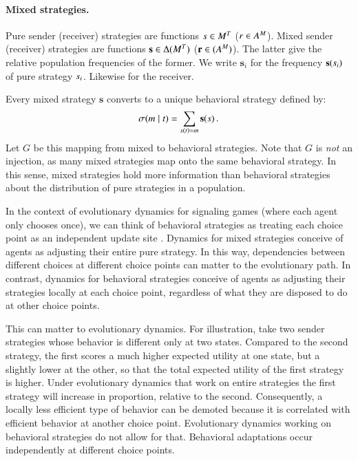 \documentclass[fleqn,reqno,10pt]{article}
\renewcommand{\Smixed}{\ensuremath{\mathrm{\mathbf{s}}}}
\renewcommand{\Rmixed}{\ensuremath{\mathrm{\mathbf{r}}}}
\begin{document}
\paragraph{Mixed strategies.} Pure sender (receiver) strategies are
functions $s \in M^T$ ($r \in
A^M$). Mixed sender (receiver) strategies are functions
$\Smixed \in \Delta(\Messgs^\States)$ ($\Rmixed \in
(\Acts^\Messgs)$). The latter give the relative population frequencies
of the former. We write $\Smixed_i$ for the frequency
$\Smixed(\Spure_i)$ of pure strategy $s_i$. Likewise for the
receiver.

Every mixed strategy $\Smixed$ converts to a unique behavioral
strategy defined by:
\begin{align}
  \label{eq:CorrespondenceBehavioralMixed}
  \Sstrat(\messg \probbar \state) = \sum_{\Spure(\state) = \messg} \Smixed(\Spure)\,.
\end{align} 
Let $G$ be this mapping from mixed to behavioral strategies. Note that $G$
is \emph{not} an injection, as many mixed strategies map onto the same
behavioral strategy. In this sense, mixed strategies hold more
information than behavioral strategies about the distribution of pure strategies in a population.

In the context of evolutionary dynamics for signaling games (where
each agent only chooses once), we can think of behavioral strategies
as treating each choice point as an independent update site
\citep[e.g.][]{Cressman2003:Evolutionary-Dy}. Dynamics for mixed
strategies conceive of agents as adjusting their entire pure
strategy. In this way, dependencies between different choices at
different choice points can matter to the evolutionary path. In
contrast, dynamics for behavioral strategies conceive of agents as
adjusting their strategies locally at each choice point, regardless of
what they are disposed to do at other choice points.

This can matter to evolutionary dynamics. For illustration, take two
sender strategies whose behavior is different only at two
states. Compared to the second strategy, the first scores a much
higher expected utility at one state, but a slightly lower at the
other, so that the total expected utility of the first strategy is
higher. Under evolutionary dynamics that work on entire strategies the
first strategy will increase in proportion, relative to the
second. Consequently, a locally less efficient type of behavior can be
demoted because it is correlated with efficient behavior at another
choice point. Evolutionary dynamics working on behavioral strategies
do not allow for that. Behavioral adaptations occur independently at
different choice points.
\end{document}

